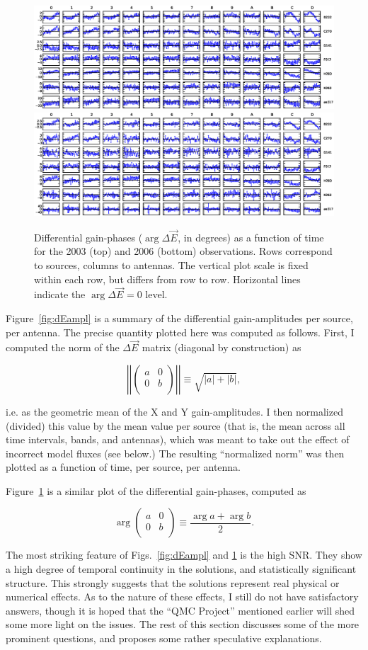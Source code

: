 \documentclass[]{aa}
\newcommand{\matrixtt}[4]{\left( \begin{array}{cc}#1&#2\\#3&#4\\\end{array} \right)}
\newcommand{\jones}[2]{\vec {#1}_{#2}}
\begin{document}
\begin{figure}
\sidecaption
\parbox[b]{12cm}{
\includegraphics[width=12cm]{o2003_dEphase_mean}
\includegraphics[width=12cm]{o2006_dEphase_mean}
}
\caption{\label{fig:dEphase}Differential gain-phases ($\arg\Delta\jones{E}{}$, in degrees) as a function of time for the 2003 (top) and 2006 (bottom) observations. Rows correspond to sources, columns to antennas. The vertical plot scale is fixed within each row, but differs from row to row. Horizontal lines indicate the $\arg\Delta\jones{E}{}=0$ level.}
\end{figure}

Figure~\ref{fig:dEampl} is a summary of the differential gain-amplitudes per source, per antenna. The precise quantity plotted here was computed as follows. First, I computed the norm of the $\Delta\jones{E}{}$ matrix (diagonal by construction) as 

\[
\left|\left|\matrixtt{a}{0}{0}{b}\right|\right| \equiv \sqrt{|a|+|b|},
\]

i.e. as the geometric mean of the X and Y gain-amplitudes. I then normalized (divided) this value by the mean value per source (that is, the mean across all time intervals, bands, and antennas), which was meant to take out the effect of incorrect model fluxes (see below.) The resulting ``normalized norm'' was then plotted as a function of time, per source, per antenna.

Figure~\ref{fig:dEphase} is a similar plot of the differential gain-phases, computed as

\[
\arg\matrixtt{a}{0}{0}{b} \equiv \frac{\arg a + \arg b}{2}.
\]

The most striking feature of Figs.~\ref{fig:dEampl} and \ref{fig:dEphase} is the high SNR. They show a high degree of temporal continuity in the solutions, and statistically significant structure. This strongly suggests that the solutions represent real physical or numerical effects. As to the nature of these effects, I still do not have satisfactory answers, though it is hoped that the ``QMC Project'' mentioned earlier will shed some more light on the issues. The rest of this section discusses some of the more prominent questions, and proposes some rather speculative explanations.
 
\end{document}
